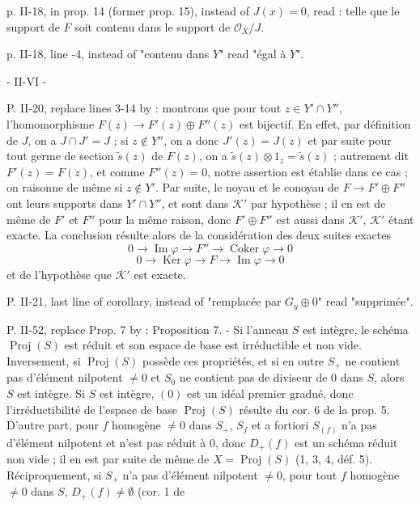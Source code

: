 p. II-18, in prop. 14 (former prop. 15), instead of $J(x)=0$, read :
telle que le support de $F$ soit contenu dans le support de $\mathcal{O}_X / J$.

p. II-18, line -4, instead of "contenu dans $Y$" read "égal à $Y$".

\newpage


- II-VI -

P. II-20, replace lines 3-14 by :
montrons que pour tout $z \in Y' \cap Y''$, l'homomorphisme $F(z) \to F'(z) \oplus F''(z)$ est bijectif. En effet, par définition de $J$, on a $J \cap J' = J$ ; si $z \notin Y''$, on a donc $J'(z) = J(z)$ et par suite pour tout germe de section $\tilde{s}(z)$ de $F(z)$, on a $\tilde{s}(z) \otimes 1_z = \tilde{s}(z)$ ; autrement dit $F'(z) = F(z)$, et comme $F''(z) = 0$, notre assertion est établie dans ce cas ; on raisonne de même si $z \notin Y'$. Par suite, le noyau et le conoyau de $F \to F' \oplus F''$ ont leurs supports dans $Y' \cap Y''$, et sont dans $\mathcal{K}'$ par hypothèse ; il en est de même de $F'$ et $F''$ pour la même raison, donc $F' \oplus F''$ est aussi dans $\mathcal{K}'$, $\mathcal{K}'$ étant exacte. La conclusion résulte alors de la considération des deux suites exactes
$$ 0 \to \operatorname{Im} \varphi \to F'' \to \operatorname{Coker} \varphi \to 0 $$
$$ 0 \to \operatorname{Ker} \varphi \to F \to \operatorname{Im} \varphi \to 0 $$
et de l'hypothèse que $\mathcal{K}'$ est exacte.

P. II-21, last line of corollary, instead of "remplacée par $G_y \oplus 0$" read "supprimée".

P. II-52, replace Prop. 7 by :
Proposition 7. - Si l'anneau $S$ est intègre, le schéma $\operatorname{Proj}(S)$ est réduit et son espace de base est irréductible et non vide. Inversement, si $\operatorname{Proj}(S)$ possède ces propriétés, et si en outre $S_+$ ne contient pas d'élément nilpotent $\neq 0$ et $S_0$ ne contient pas de diviseur de $0$ dans $S$, alors $S$ est intègre.
Si $S$ est intègre, $(0)$ est un idéal premier gradué, donc l'irréductibilité de l'espace de base $\operatorname{Proj}(S)$ résulte du cor. 6 de la prop. 5. D'autre part, pour $f$ homogène $\neq 0$ dans $S_+$, $S_f$ et a fortiori $S_{(f)}$ n'a pas d'élément nilpotent et n'est pas réduit à $0$, donc $D_+(f)$ est un schéma réduit non vide ; il en est par suite de même de $X = \operatorname{Proj}(S)$ (1, 3, 4, déf. 5). Réciproquement, si $S_+$ n'a pas d'élément nilpotent $\neq 0$, pour tout $f$ homogène $\neq 0$ dans $S$, $D_+(f) \neq \emptyset$ (cor. 1 de

